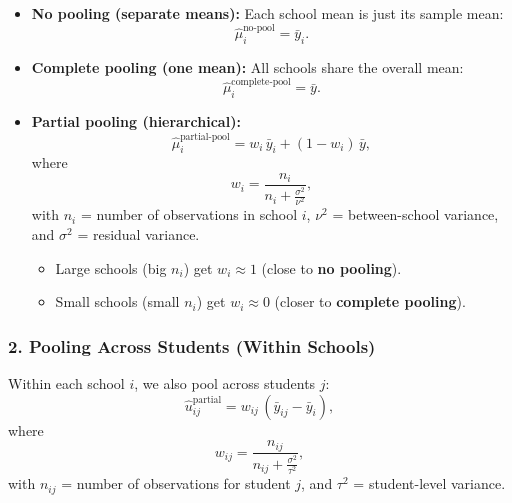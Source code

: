 \documentclass[
  letterpaper,
  DIV=11,
  numbers=noendperiod]{scrreprt}
\providecommand{\tightlist}{%
  \setlength{\itemsep}{0pt}\setlength{\parskip}{0pt}}\usepackage{longtable,booktabs,array}
\begin{document}
\begin{itemize}
\item
  \textbf{No pooling (separate means):} Each school mean is just its
  sample mean: \[
  \hat{\mu}_i^{\text{no-pool}} = \bar{y}_i.
  \]
\item
  \textbf{Complete pooling (one mean):} All schools share the overall
  mean: \[
  \hat{\mu}_i^{\text{complete-pool}} = \bar{y}.
  \]
\item
  \textbf{Partial pooling (hierarchical):} \[
  \hat{\mu}_i^{\text{partial-pool}} = w_i \, \bar{y}_i + (1 - w_i)\, \bar{y},
  \] where \[
  w_i = \frac{n_i}{n_i + \frac{\sigma^2}{\nu^2}},
  \] with \(n_i\) = number of observations in school \(i\), \(\nu^2\) =
  between-school variance, and \(\sigma^2\) = residual variance.

  \begin{itemize}
  \tightlist
  \item
    Large schools (big \(n_i\)) get \(w_i \approx 1\) (close to
    \textbf{no pooling}).
  \item
    Small schools (small \(n_i\)) get \(w_i \approx 0\) (closer to
    \textbf{complete pooling}).
  \end{itemize}
\end{itemize}

\hypertarget{pooling-across-students-within-schools}{%
\subsubsection*{2. Pooling Across Students (Within
Schools)}\label{pooling-across-students-within-schools}}

Within each school \(i\), we also pool across students \(j\): \[
  \hat{u}_{ij}^{\text{partial}} = w_{ij} \, (\bar{y}_{ij} - \bar{y}_i),
  \] where \[
  w_{ij} = \frac{n_{ij}}{n_{ij} + \frac{\sigma^2}{\tau^2}},
  \] with \(n_{ij}\) = number of observations for student \(j\), and
\(\tau^2\) = student-level variance.
\end{document}
